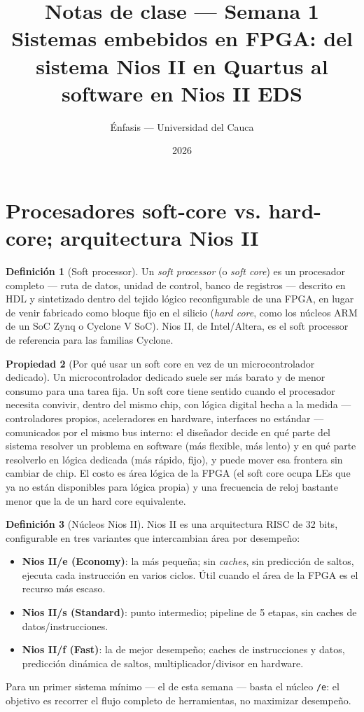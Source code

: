 \documentclass[11pt,letterpaper]{article}
\title{\textcolor{unicaucaverde}{\Large Notas de clase --- Semana 1}\\[4pt]
  \large Sistemas embebidos en FPGA: del sistema Nios II en Quartus al software en Nios II EDS}
\author{Énfasis --- Universidad del Cauca}
\date{2026}
\theoremstyle{definition}
\newtheorem{definicion}{Definición}[section]
\newtheorem{propiedad}[definicion]{Propiedad}
\begin{document}
\maketitle
\tableofcontents

\section{Procesadores soft-core vs. hard-core; arquitectura Nios II}

\begin{definicion}[Soft processor]
Un \emph{soft processor} (o \emph{soft core}) es un procesador completo --- ruta de datos, unidad
de control, banco de registros --- descrito en HDL y sintetizado dentro del tejido lógico
reconfigurable de una FPGA, en lugar de venir fabricado como bloque fijo en el silicio
(\emph{hard core}, como los núcleos ARM de un SoC Zynq o Cyclone V SoC). Nios II, de
Intel/Altera, es el soft processor de referencia para las familias Cyclone.
\end{definicion}

\begin{propiedad}[Por qué usar un soft core en vez de un microcontrolador dedicado]
Un microcontrolador dedicado suele ser más barato y de menor consumo para una tarea fija. Un soft
core tiene sentido cuando el procesador necesita convivir, dentro del mismo chip, con lógica digital
hecha a la medida --- controladores propios, aceleradores en hardware, interfaces no estándar ---
comunicados por el mismo bus interno: el diseñador decide en qué parte del sistema resolver un
problema en software (más flexible, más lento) y en qué parte resolverlo en lógica dedicada (más
rápido, fijo), y puede mover esa frontera sin cambiar de chip. El costo es área lógica de la FPGA
(el soft core ocupa LEs que ya no están disponibles para lógica propia) y una frecuencia de reloj
bastante menor que la de un hard core equivalente.
\end{propiedad}

\begin{definicion}[Núcleos Nios II]
Nios II es una arquitectura RISC de 32 bits, configurable en tres variantes que intercambian área
por desempeño:
\begin{itemize}[leftmargin=1.2cm]
  \item \textbf{Nios II/e (Economy)}: la más pequeña; sin \emph{caches}, sin predicción de saltos,
        ejecuta cada instrucción en varios ciclos. Útil cuando el área de la FPGA es el recurso más
        escaso.
  \item \textbf{Nios II/s (Standard)}: punto intermedio; pipeline de 5 etapas, sin caches de
        datos/instrucciones.
  \item \textbf{Nios II/f (Fast)}: la de mejor desempeño; caches de instrucciones y datos,
        predicción dinámica de saltos, multiplicador/divisor en hardware.
\end{itemize}
Para un primer sistema mínimo --- el de esta semana --- basta el núcleo \texttt{/e}: el objetivo es
recorrer el flujo completo de herramientas, no maximizar desempeño.
\end{definicion}
\end{document}
